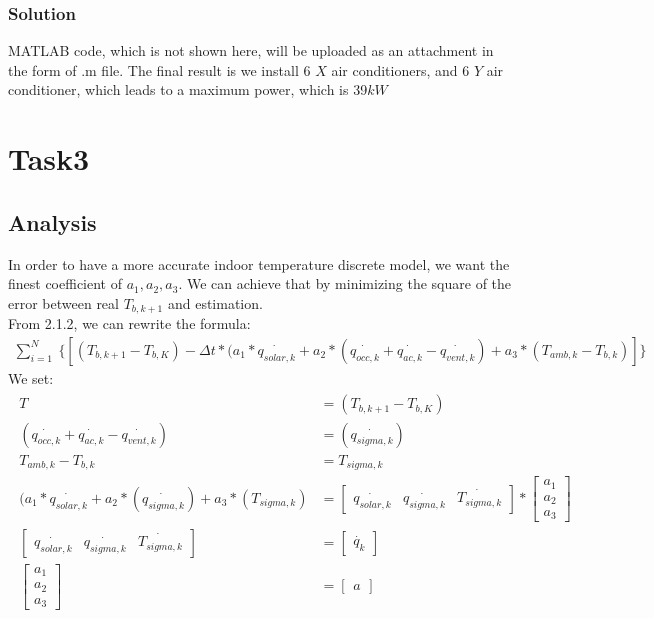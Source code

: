 \documentclass{article}
\begin{document}
        \subsubsection{Solution}
            MATLAB code, which is not shown here, will be uploaded as an attachment in the form of .m file. The final result is we install 6 $X$ air conditioners, and 6 $Y$ air conditioner, which leads to a maximum power, which is 39$kW$
            
    
    
    
\section{Task3}
    \subsection{Analysis}
        In order to have a more accurate indoor temperature discrete model, we want the finest coefficient of $a_1,a_2,a_3$. We can achieve that by minimizing the square of the error between real $T_{b,k+1}$ and estimation.\\
        From 2.1.2, we can rewrite the formula:
        \begin{align}\label{1.10}
            \sum_{i=1}^N \:\{[(T_{b,k+1} - T_{b,K}) - \Delta t * (a_1*\dot{q_{solar,k}} + a_2*(\dot{q_{occ,k}}+\dot{q_{ac,k}}-\dot{q_{vent,k}}) + a_3*(T_{amb,k} - T_{b,k}) ]  \}
        \end{align}
        We set:
        \begin{align}
        \begin{split}
            T &= (T_{b,k+1} - T_{b,K})\\
            (\dot{q_{occ,k}}+\dot{q_{ac,k}}-\dot{q_{vent,k}}) &= (\dot{q_{sigma,k}})\\
            T_{amb,k} - T_{b,k} &= T_{sigma,k}\\
            (a_1*\dot{q_{solar,k}} + a_2*(\dot{q_{sigma,k}}) + a_3*(T_{sigma,k}) &= 
            \begin{bmatrix} \dot{q_{solar,k}}&\dot{q_{sigma,k}}&\dot{T_{sigma,k}} \end{bmatrix} * \begin{bmatrix} a_1\\a_2\\a_3 \end{bmatrix}\\
            \begin{bmatrix} \dot{q_{solar,k}}&\dot{q_{sigma,k}}&\dot{T_{sigma,k}} \end{bmatrix} &= 
            \begin{bmatrix} \dot{q_k} \end{bmatrix}\\
            \begin{bmatrix} a_1\\a_2\\a_3 \end{bmatrix} &= \begin{bmatrix} a \end{bmatrix}
        \end{split}
        \end{align}
\end{document}
